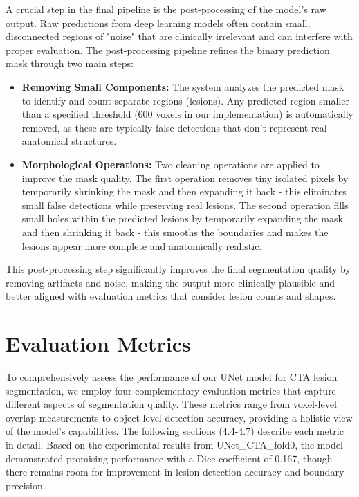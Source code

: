 A crucial step in the final pipeline is the post-processing of the model's raw output. Raw predictions from deep learning models often contain small, disconnected regions of "noise" that are clinically irrelevant and can interfere with proper evaluation. The post-processing pipeline refines the binary prediction mask through two main steps:

\begin{itemize}
    \item \textbf{Removing Small Components:} The system analyzes the predicted mask to identify and count separate regions (lesions). Any predicted region smaller than a specified threshold (600 voxels in our implementation) is automatically removed, as these are typically false detections that don't represent real anatomical structures.

    \item \textbf{Morphological Operations:} Two cleaning operations are applied to improve the mask quality. The first operation removes tiny isolated pixels by temporarily shrinking the mask and then expanding it back - this eliminates small false detections while preserving real lesions. The second operation fills small holes within the predicted lesions by temporarily expanding the mask and then shrinking it back - this smooths the boundaries and makes the lesions appear more complete and anatomically realistic.
\end{itemize}

This post-processing step significantly improves the final segmentation quality by removing artifacts and noise, making the output more clinically plausible and better aligned with evaluation metrics that consider lesion counts and shapes.

\section{Evaluation Metrics}
\label{sec:evaluation_metrics}

To comprehensively assess the performance of our UNet model for CTA lesion segmentation, we employ four complementary evaluation metrics that capture different aspects of segmentation quality. These metrics range from voxel-level overlap measurements to object-level detection accuracy, providing a holistic view of the model's capabilities. The following sections (4.4-4.7) describe each metric in detail. Based on the experimental results from UNet\_CTA\_fold0, the model demonstrated promising performance with a Dice coefficient of 0.167, though there remains room for improvement in lesion detection accuracy and boundary precision.

